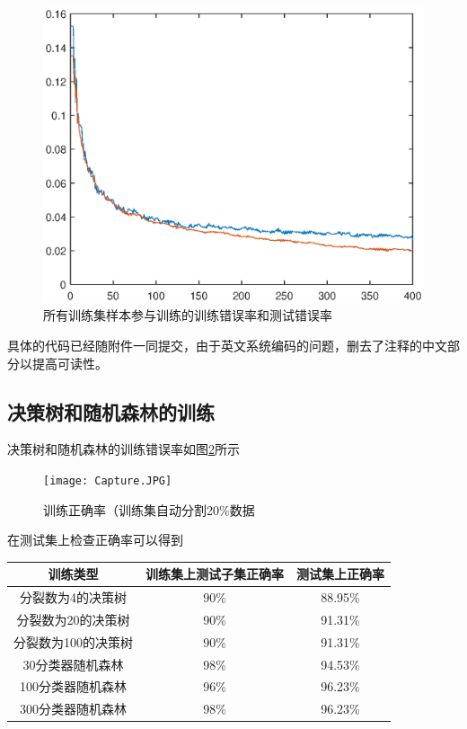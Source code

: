 \documentclass[UTF8,a4paper]{paper}
\begin{document}
\begin{figure}
\centering
\includegraphics[width=\textwidth]{alltrained.eps}
\caption{所有训练集样本参与训练的训练错误率和测试错误率}
\label{fig2}
\end{figure}

具体的代码已经随附件一同提交，由于英文系统编码的问题，删去了注释的中文部分以提高可读性。

\subsection{决策树和随机森林的训练}
决策树和随机森林的训练错误率如图\ref{fig3}所示

\begin{figure}
\centering
\texttt{[image: Capture.JPG]}
\caption{训练正确率（训练集自动分割20\%数据}
\label{fig3}
\end{figure}

在测试集上检查正确率可以得到
\begin{table}
\centering
\begin{tabular}{|c|c|c|}
\hline
训练类型&训练集上测试子集正确率&测试集上正确率\\
\hline
分裂数为4的决策树&90\%&88.95\%\\
\hline
分裂数为20的决策树&90\%&91.31\%\\
\hline
分裂数为100的决策树&90\%&91.31\%\\
\hline
30分类器随机森林&98\%&94.53\%\\
\hline
100分类器随机森林&96\%&96.23\%\\
\hline
300分类器随机森林&98\%&96.23\%\\
\hline
\end{tabular}
\end{table}
\end{document}
